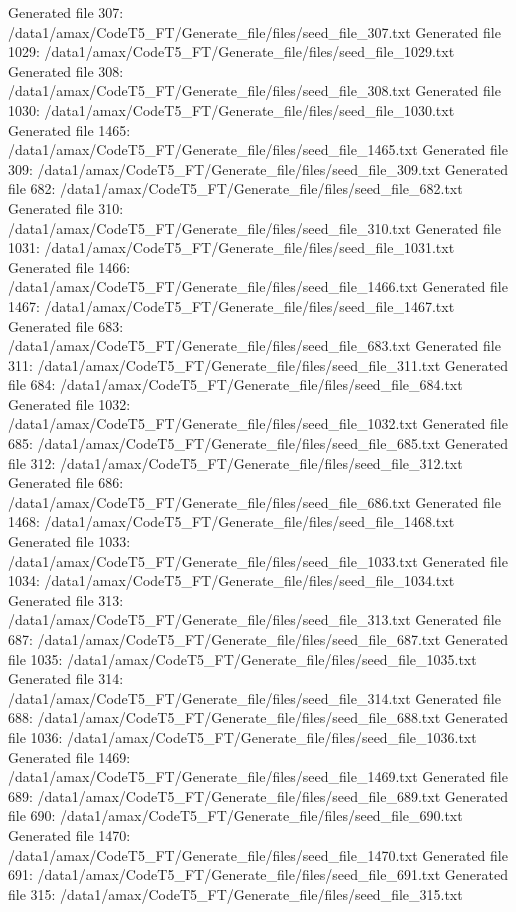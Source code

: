 Generated file 307: /data1/amax/CodeT5_FT/Generate_file/files/seed_file_307.txt
Generated file 1029: /data1/amax/CodeT5_FT/Generate_file/files/seed_file_1029.txt
Generated file 308: /data1/amax/CodeT5_FT/Generate_file/files/seed_file_308.txt
Generated file 1030: /data1/amax/CodeT5_FT/Generate_file/files/seed_file_1030.txt
Generated file 1465: /data1/amax/CodeT5_FT/Generate_file/files/seed_file_1465.txt
Generated file 309: /data1/amax/CodeT5_FT/Generate_file/files/seed_file_309.txt
Generated file 682: /data1/amax/CodeT5_FT/Generate_file/files/seed_file_682.txt
Generated file 310: /data1/amax/CodeT5_FT/Generate_file/files/seed_file_310.txt
Generated file 1031: /data1/amax/CodeT5_FT/Generate_file/files/seed_file_1031.txt
Generated file 1466: /data1/amax/CodeT5_FT/Generate_file/files/seed_file_1466.txt
Generated file 1467: /data1/amax/CodeT5_FT/Generate_file/files/seed_file_1467.txt
Generated file 683: /data1/amax/CodeT5_FT/Generate_file/files/seed_file_683.txt
Generated file 311: /data1/amax/CodeT5_FT/Generate_file/files/seed_file_311.txt
Generated file 684: /data1/amax/CodeT5_FT/Generate_file/files/seed_file_684.txt
Generated file 1032: /data1/amax/CodeT5_FT/Generate_file/files/seed_file_1032.txt
Generated file 685: /data1/amax/CodeT5_FT/Generate_file/files/seed_file_685.txt
Generated file 312: /data1/amax/CodeT5_FT/Generate_file/files/seed_file_312.txt
Generated file 686: /data1/amax/CodeT5_FT/Generate_file/files/seed_file_686.txt
Generated file 1468: /data1/amax/CodeT5_FT/Generate_file/files/seed_file_1468.txt
Generated file 1033: /data1/amax/CodeT5_FT/Generate_file/files/seed_file_1033.txt
Generated file 1034: /data1/amax/CodeT5_FT/Generate_file/files/seed_file_1034.txt
Generated file 313: /data1/amax/CodeT5_FT/Generate_file/files/seed_file_313.txt
Generated file 687: /data1/amax/CodeT5_FT/Generate_file/files/seed_file_687.txt
Generated file 1035: /data1/amax/CodeT5_FT/Generate_file/files/seed_file_1035.txt
Generated file 314: /data1/amax/CodeT5_FT/Generate_file/files/seed_file_314.txt
Generated file 688: /data1/amax/CodeT5_FT/Generate_file/files/seed_file_688.txt
Generated file 1036: /data1/amax/CodeT5_FT/Generate_file/files/seed_file_1036.txt
Generated file 1469: /data1/amax/CodeT5_FT/Generate_file/files/seed_file_1469.txt
Generated file 689: /data1/amax/CodeT5_FT/Generate_file/files/seed_file_689.txt
Generated file 690: /data1/amax/CodeT5_FT/Generate_file/files/seed_file_690.txt
Generated file 1470: /data1/amax/CodeT5_FT/Generate_file/files/seed_file_1470.txt
Generated file 691: /data1/amax/CodeT5_FT/Generate_file/files/seed_file_691.txt
Generated file 315: /data1/amax/CodeT5_FT/Generate_file/files/seed_file_315.txt
